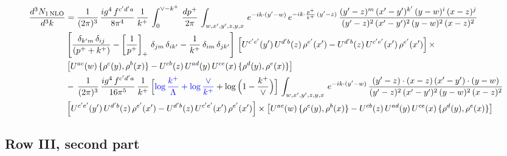 \documentclass[9pt]{article}
\numberwithin{equation}{section}
\begin{document}
\begin{align}
     \frac{d^{3}N_{1\,\rm NLO}}{d^{3}k} & = \frac{1}{(2\pi)^{3}}\, \frac{ig^{4}\,f^{c'd'a}}{8\pi^{4}}\, \frac{1}{k^{+}}\,\int_{0}^{\vee-k^{+}}\,  \frac{dp^{+}}{2\pi}\, \int_{w,x',y',z,y,x}\, e^{-ik\cdot (y'-w)}\, e^{-ik\cdot \frac{p^{+}}{k^{+}}\,(y'-z)}\,\frac{(y'-z)^{m}\,(x'-y')^{k'}\,(y-w)^{i}\,(x-z)^{j}}{(y'-z)^{2}\,(x'-y')^{2}\,(y-w)^{2}\,(x-z)^{2}}\notag \\ & \left[\frac{\delta_{k'm}\,\delta_{ij}}{(p^{+}+k^{+})}-\left[\frac{1}{p^{+}}\right]_{+}\,\delta_{jm}\,\delta_{ik'}-\frac{1}{k^{+}}\, \delta_{im}\, \delta_{jk'}\right]\, \left[U^{c'e'}(y')\,U^{d'b}(z)\,\rho^{e'}(x')-U^{d'b}(z)\,U^{c'e'}(x')\,\rho^{e'}(x')\right]\times\notag \\ &  \left[U^{ac}(w)\, \{\rho^{c}(y),\rho^{b}(x)\}-U^{cb}(z)\,U^{ad}(y)\,U^{ce}(x)\,\{\rho^{d}(y),\rho^{e}(x)\}\right]\notag \\ & -\,\frac{1}{(2\pi)^{3}}\, \frac{ig^{4}\,f^{c'd'a}}{16\pi^{5}}\, \frac{1}{k^{+}}\,\Big[{\color{blue}\log\frac{k^{+}}{\Lambda}+\log\frac{\vee}{k^{+}}}+\log\Big(1-\frac{k^{+}}{\vee}\Big)\Big]\, \int_{w,x',y',z,y,x}\, e^{-ik\cdot (y'-w)}\,\frac{(y'-z)\cdot (x-z)\,(x'-y')\cdot (y-w)}{(y'-z)^{2}\,(x'-y')^{2}\,(y-w)^{2}\,(x-z)^{2}}\notag \\ &  \left[U^{c'e'}(y')\,U^{d'b}(z)\,\rho^{e'}(x')-U^{d'b}(z)\,U^{c'e'}(x')\,\rho^{e'}(x')\right]\times  \left[U^{ac}(w)\, \{\rho^{c}(y),\rho^{b}(x)\}-U^{cb}(z)\,U^{ad}(y)\,U^{ce}(x)\,\{\rho^{d}(y),\rho^{e}(x)\}\right]
\end{align} 

\subsection{Row III, second part}
\end{document}
